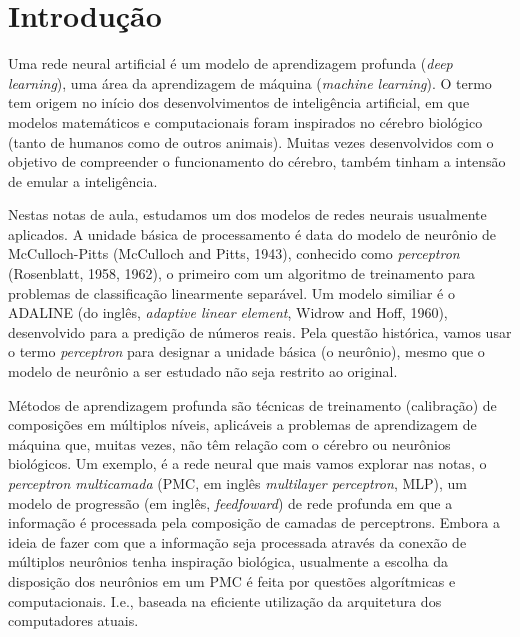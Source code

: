 
\chapter{Introdução}\label{cap_intro}
\thispagestyle{fancy}

Uma rede neural artificial é um modelo de aprendizagem profunda (\emph{deep learning}), uma área da aprendizagem de máquina (\emph{machine learning}). O termo tem origem no início dos desenvolvimentos de inteligência artificial, em que modelos matemáticos e computacionais foram inspirados no cérebro biológico (tanto de humanos como de outros animais). Muitas vezes desenvolvidos com o objetivo de compreender o funcionamento do cérebro, também tinham a intensão de emular a inteligência.

Nestas notas de aula, estudamos um dos modelos de redes neurais usualmente aplicados. A unidade básica de processamento é data do modelo de neurônio de McCulloch-Pitts (McCulloch and Pitts, 1943), conhecido como \emph{perceptron} (Rosenblatt, 1958, 1962), o primeiro com um algoritmo de treinamento para problemas de classificação linearmente separável. Um modelo similiar é o ADALINE (do inglês, {\it adaptive linear element}, Widrow and Hoff, 1960), desenvolvido para a predição de números reais. Pela questão histórica, vamos usar o termo \emph{perceptron} para designar a unidade básica (o neurônio), mesmo que o modelo de neurônio a ser estudado não seja restrito ao original.

Métodos de aprendizagem profunda são técnicas de treinamento (calibração) de composições em múltiplos níveis, aplicáveis a problemas de aprendizagem de máquina que, muitas vezes, não têm relação com o cérebro ou neurônios biológicos. Um exemplo, é a rede neural que mais vamos explorar nas notas, o \emph{perceptron multicamada} (PMC, em inglês {\it multilayer perceptron}, MLP), um modelo de progressão (em inglês, {\it feedfoward}) de rede profunda em que a informação é processada pela composição de camadas de perceptrons. Embora a ideia de fazer com que a informação seja processada através da conexão de múltiplos neurônios tenha inspiração biológica, usualmente a escolha da disposição dos neurônios em um PMC é feita por questões algorítmicas e computacionais. I.e., baseada na eficiente utilização da arquitetura dos computadores atuais.

